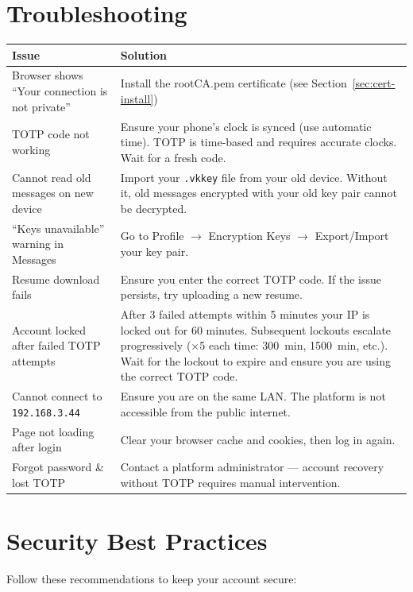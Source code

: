 \documentclass[12pt,a4paper]{article}
\begin{document}
\section{Troubleshooting}

\begin{longtable}{p{5cm}p{8.5cm}}
\toprule
\textbf{Issue} & \textbf{Solution} \\
\midrule
Browser shows ``Your connection is not private'' & Install the rootCA.pem certificate (see Section~\ref{sec:cert-install}) \\
\midrule
TOTP code not working & Ensure your phone's clock is synced (use automatic time). TOTP is time-based and requires accurate clocks. Wait for a fresh code. \\
\midrule
Cannot read old messages on new device & Import your \texttt{.vkkey} file from your old device. Without it, old messages encrypted with your old key pair cannot be decrypted. \\
\midrule
``Keys unavailable'' warning in Messages & Go to Profile $\rightarrow$ Encryption Keys $\rightarrow$ Export/Import your key pair. \\
\midrule
Resume download fails & Ensure you enter the correct TOTP code. If the issue persists, try uploading a new resume. \\
\midrule
Account locked after failed TOTP attempts & After 3 failed attempts within 5 minutes your IP is locked out for 60 minutes. Subsequent lockouts escalate progressively ($\times$5 each time: 300~min, 1500~min, etc.). Wait for the lockout to expire and ensure you are using the correct TOTP code. \\
\midrule
Cannot connect to \texttt{192.168.3.44} & Ensure you are on the same LAN. The platform is not accessible from the public internet. \\
\midrule
Page not loading after login & Clear your browser cache and cookies, then log in again. \\
\midrule
Forgot password \& lost TOTP & Contact a platform administrator --- account recovery without TOTP requires manual intervention. \\
\bottomrule
\end{longtable}


\section{Security Best Practices}

Follow these recommendations to keep your account secure:
\end{document}
